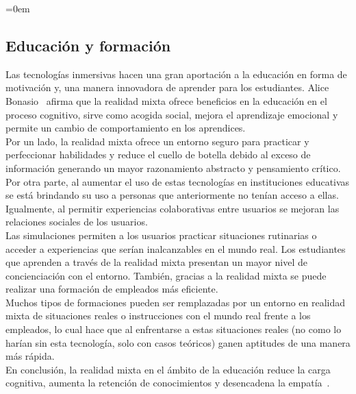 \parindent=0em
\subsection{Educación y formación}
\noindent

Las tecnologías inmersivas hacen una gran aportación a la educación en forma de motivación y, una manera innovadora de aprender para los estudiantes. Alice Bonasio~\cite{microsoftEducation} afirma que la realidad mixta ofrece beneficios en la educación en el proceso cognitivo, sirve como acogida social, mejora el aprendizaje emocional y permite un cambio de comportamiento en los aprendices.\\ 

Por un lado, la realidad mixta ofrece un entorno seguro para practicar y perfeccionar habilidades y reduce el cuello de botella debido al exceso de información generando un mayor razonamiento abstracto y pensamiento crítico.\\ 

Por otra parte, al aumentar el uso de estas tecnologías en instituciones educativas se está brindando su uso a personas que anteriormente no tenían acceso a ellas. Igualmente, al permitir experiencias colaborativas entre usuarios se mejoran las relaciones sociales de los usuarios.\\

Las simulaciones permiten a los usuarios practicar situaciones rutinarias o acceder a experiencias que serían inalcanzables en el mundo real. Los estudiantes que aprenden a través de la realidad mixta presentan un mayor nivel de concienciación con el entorno. También, gracias a la realidad mixta se puede realizar una formación de empleados más eficiente.\\

Muchos tipos de formaciones pueden ser remplazadas por un entorno en realidad mixta de situaciones reales o instrucciones con el mundo real frente a los empleados, lo cual hace que al enfrentarse a estas situaciones reales (no como lo harían sin esta tecnología, solo con casos teóricos) ganen aptitudes de una manera más rápida.\\
 
En conclusión, la realidad mixta en el ámbito de la educación reduce la carga cognitiva, aumenta la retención de conocimientos y desencadena la empatía~\cite{microsoftEducation}.\\



